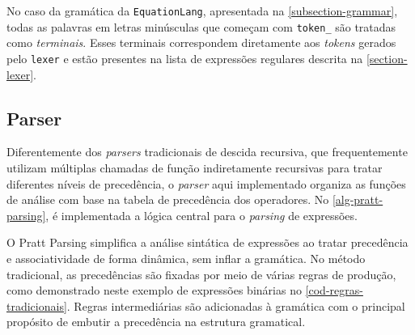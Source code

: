 No caso da gramática da \texttt{EquationLang}, apresentada na \autoref{subsection-grammar}, todas as palavras em letras minúsculas que começam com \texttt{token\_} são tratadas como \textit{terminais}. Esses terminais correspondem diretamente aos \textit{tokens} gerados pelo \texttt{lexer} e estão presentes na lista de expressões regulares descrita na \autoref{section-lexer}.

%
%
%




\subsection{Parser} \label{section-parser-pratt}
Diferentemente dos \textit{parsers} tradicionais de descida recursiva, que frequentemente utilizam múltiplas chamadas de função indiretamente recursivas para tratar diferentes níveis de precedência, o \textit{parser} aqui implementado organiza as funções de análise com base na tabela de precedência dos operadores. No \autoref{alg-pratt-parsing}, é implementada a lógica central para o \textit{parsing} de expressões.

O Pratt Parsing simplifica a análise sintática de expressões ao tratar precedência e associatividade de forma dinâmica, sem inflar a gramática. No método tradicional, as precedências são fixadas por meio de várias regras de produção, como demonstrado neste exemplo de expressões binárias no \autoref{cod-regras-tradicionais}. Regras intermediárias são adicionadas à gramática com o principal propósito de embutir a precedência na estrutura gramatical.

